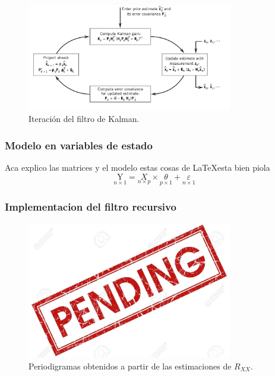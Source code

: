 \begin{figure}[H]
\centering

	\includegraphics[width=0.8\textwidth, trim = {0 0 0 0},clip]{./Imagenes/kalman_loop.png}
	\caption{Iteración del filtro de Kalman.}
	\label{fig:Kalman_loop}

\end{figure}

\subsubsection{Modelo en variables de estado}
Aca explico las matrices y el modelo estas cosas de \LaTeX esta bien piola
\begin{equation}
\underset{n\times 1}{\mathrm{Y}} =  \underset{n\times p}{X} \times 
\underset{p\times 1}{\theta} + \underset{n\times 1}{\varepsilon}
\end{equation}

\subsubsection{Implementacion del filtro recursivo}

\begin{figure}[H]
\centering
	\includegraphics[width=0.8\textwidth, trim = {0 0 0 0.735cm},clip]{./Imagenes/pend.jpg}
	\caption{Periodigramas obtenidos a partir de las estimaciones de $R_{XX}$.}
	\label{fig:period-est}
\end{figure}

